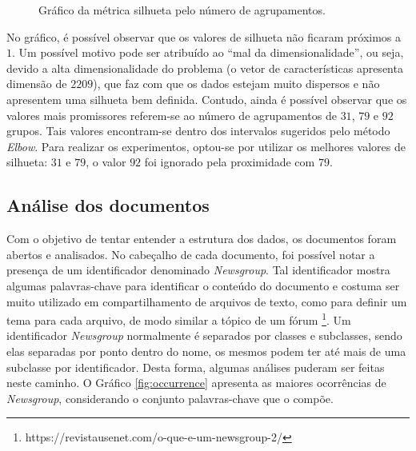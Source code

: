 \documentclass[conference]{IEEEtran}
\begin{document}
\begin{figure}[!h]
	\centering
	{
	}
	\caption{\small Gráfico da métrica silhueta pelo número de agrupamentos.}
	\label{fig:silhueta}
\end{figure}

No gráfico, é possível observar que os valores de silhueta não ficaram próximos a $1$. Um possível motivo pode ser atribuído ao ``mal da dimensionalidade'', ou seja, devido a alta dimensionalidade do problema (o vetor de características apresenta dimensão de $2209$), que faz com que os dados estejam muito dispersos e não apresentem uma silhueta bem definida. Contudo, ainda é possível observar que os valores mais promissores referem-se ao número de agrupamentos de $31$, $79$ e $92$ grupos. Tais valores encontram-se dentro dos intervalos sugeridos pelo método \textit{Elbow}. Para realizar os experimentos, optou-se por utilizar os melhores valores de silhueta: $31$ e $79$, o valor $92$ foi ignorado pela proximidade com $79$.


\subsection{Análise dos documentos}

Com o objetivo de tentar entender a estrutura dos dados, os documentos foram abertos e analisados. No cabeçalho de cada documento, foi possível notar a presença de um identificador denominado \emph{Newsgroup}. Tal identificador mostra algumas palavras-chave para identificar o conteúdo do documento e costuma ser muito utilizado em compartilhamento de arquivos de texto, como para definir um tema para cada arquivo, de modo similar a tópico de um fórum \footnote{https://revistausenet.com/o-que-e-um-newsgroup-2/}. Um identificador \emph{Newsgroup} normalmente é separados por classes e subclasses, sendo elas separadas por ponto dentro do nome, os mesmos podem ter até mais de uma subclasse por identificador. Desta forma, algumas análises puderam ser feitas neste caminho. O Gráfico \ref{fig:occurrence} apresenta as maiores ocorrências de \emph{Newsgroup}, considerando o conjunto palavras-chave que o compõe.
\end{document}
